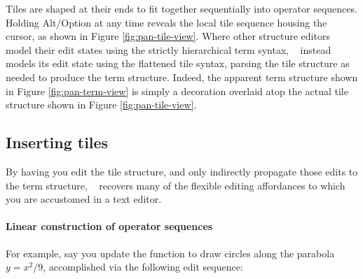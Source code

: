 Tiles are shaped at their ends to fit together sequentially
into operator sequences.
Holding Alt/Option at any time reveals the local tile sequence
housing the cursor, as shown in Figure \ref{fig:pan-tile-view}.
Where other structure editors model their edit states
using the strictly hierarchical term syntax,
\tylr~ instead models its edit state
using the flattened tile syntax, parsing the tile structure
as needed to produce the term structure.
Indeed, the apparent term structure shown in Figure
\ref{fig:pan-term-view} is simply a
decoration overlaid atop the actual tile structure shown in
Figure \ref{fig:pan-tile-view}.




\subsection{Inserting tiles}
By having you edit the tile structure, and only
indirectly propagate those edits to the term structure,
\tylr~ recovers many of the flexible editing affordances to
which you are accustomed in a text editor.

\paragraph{Linear construction of operator sequences}
For example, say you update the function to
draw circles along the parabola $y = x^2/9$,
accomplished via the following edit sequence:

